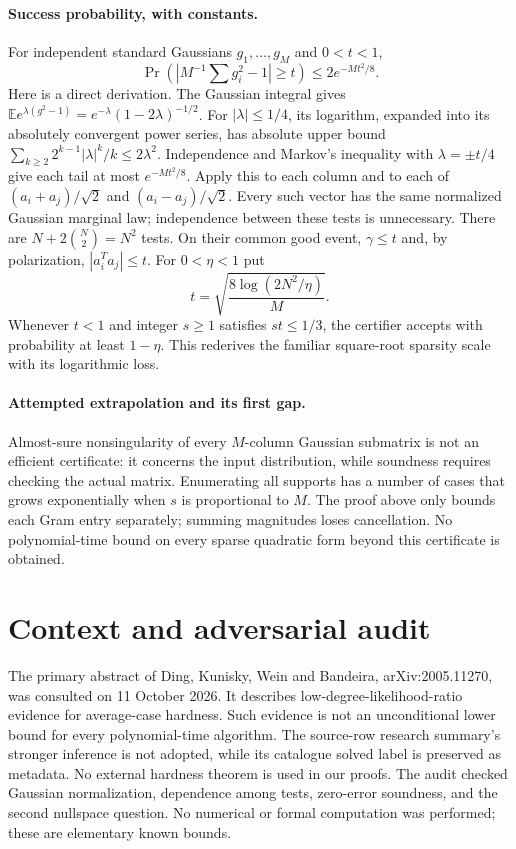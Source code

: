 \documentclass[11pt]{article}
\begin{document}
\paragraph{Success probability, with constants.}
For independent standard Gaussians $g_1,\ldots,g_M$ and $0<t<1$,
\[
\Pr\left(\left|M^{-1}\sum g_i^2-1\right|\ge t\right)
\le2e^{-Mt^2/8}.
\]
Here is a direct derivation. The Gaussian integral gives
$\mathbb E e^{\lambda(g^2-1)}=e^{-\lambda}(1-2\lambda)^{-1/2}$.
For $|\lambda|\le1/4$, its logarithm, expanded into its absolutely convergent
power series, has absolute upper bound
$\sum_{k\ge2}2^{k-1}|\lambda|^k/k\le2\lambda^2$.
Independence and Markov's inequality with $\lambda=\pm t/4$ give each
tail at most $e^{-Mt^2/8}$.
Apply this to each column and to each of $(a_i+a_j)/\sqrt2$ and
$(a_i-a_j)/\sqrt2$. Every such vector has the same normalized Gaussian
marginal law; independence between these tests is unnecessary. There are
$N+2\binom N2=N^2$ tests. On their common good event,
$\gamma\le t$ and, by polarization, $|a_i^Ta_j|\le t$.
For $0<\eta<1$ put
\[
t=\sqrt{\frac{8\log(2N^2/\eta)}M}.
\]
Whenever $t<1$ and integer $s\ge1$ satisfies $st\le1/3$, the certifier
accepts with probability at least $1-\eta$. This rederives the familiar
square-root sparsity scale with its logarithmic loss.

\paragraph{Attempted extrapolation and its first gap.}
Almost-sure nonsingularity of every $M$-column Gaussian submatrix is not an
efficient certificate: it concerns the input distribution, while soundness
requires checking the actual matrix. Enumerating all supports has a number
of cases that grows exponentially when $s$ is proportional to $M$.
The proof above only bounds each Gram entry separately; summing magnitudes
loses cancellation. No polynomial-time bound on every sparse quadratic form
beyond this certificate is obtained.

\section{Context and adversarial audit}
The primary abstract of Ding, Kunisky, Wein and Bandeira, arXiv:2005.11270,
was consulted on 11 October 2026. It describes low-degree-likelihood-ratio
evidence for average-case hardness. Such evidence is not an unconditional
lower bound for every polynomial-time algorithm. The source-row research
summary's stronger inference is not adopted, while its catalogue solved
label is preserved as metadata. No external hardness theorem is used in our
proofs. The audit checked Gaussian normalization, dependence among tests,
zero-error soundness, and the second nullspace question. No numerical or
formal computation was performed; these are elementary known bounds.
\end{document}
